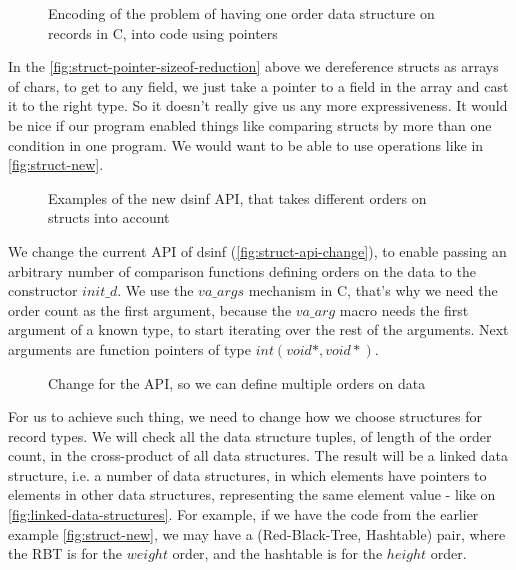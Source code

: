 \documentclass[a4paper,11pt]{article}
\begin{document}
            \begin{figure}[h!]
				

				\caption{Encoding of the problem of having one order data structure on records in C,
				into code using pointers}

				\label{fig:struct-pointer-sizeof-reduction}
			\end{figure}

			In the \autoref{fig:struct-pointer-sizeof-reduction} above we dereference structs as arrays of
			chars, to get to any field, we just take a pointer to a field in the array and cast it to the
			right type. So it doesn't really give us any more expressiveness. It would be nice if our
			program enabled things like comparing structs by more than one condition in one program. We
			would want to be able to use operations like in \autoref{fig:struct-new}.

            \begin{figure}[h!]
				

				\caption{Examples of the new dsinf API, that takes different orders on structs into
				account}

				\label{fig:struct-new}
			\end{figure}

            We change the current API of dsinf (\autoref{fig:struct-api-change}), to enable passing an arbitrary number
            of comparison functions defining orders on the data to the constructor $init\_d$. We use the $va\_args$
            mechanism in C, that's why we need the order count as the first argument, because the $va\_arg$ macro needs
            the first argument of a known type, to start iterating over the rest of the arguments. Next arguments are
            function pointers of type $int(void *, void *)$.

            \begin{figure}[h!]
				

				\caption{Change for the API, so we can define multiple orders on data}

				\label{fig:struct-api-change}
			\end{figure}

            For us to achieve such thing, we need to change how we choose structures for record types. We will check all
            the data structure tuples, of length of the order count, in the cross-product of all data structures. The
            result will be a linked data structure, i.e. a number of data structures, in which elements have pointers to
            elements in other data structures, representing the same element value - like on
            \autoref{fig:linked-data-structures}. For example, if we have the code from the earlier example
            \autoref{fig:struct-new}, we may have a (Red-Black-Tree, Hashtable) pair, where the RBT is for the $weight$
            order, and the hashtable is for the $height$ order.
\end{document}
